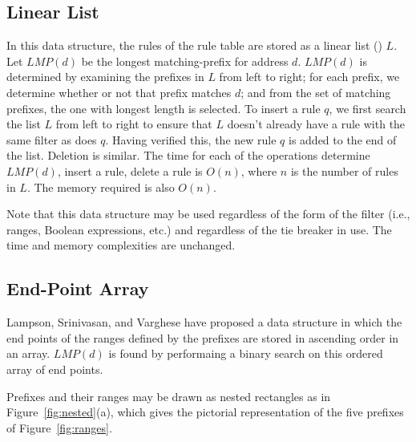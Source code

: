 \subsection{Linear List}
In this data structure, the rules of the rule table are stored as a linear
list (\cite{horo1}) $L$. Let $LMP(d)$ be the longest
matching-prefix for address $d$.
$LMP(d)$ is determined by examining the prefixes in $L$
from left to right; for each prefix, we determine whether or not that prefix
matches $d$; and from the set of matching prefixes, the one with
longest length is selected.
To insert a rule $q$, we first search the list $L$ from left to right to ensure
that $L$ doesn't already have a rule with the same filter as does
$q$. Having verified this, the new rule $q$ is added to the end of the list.
Deletion is similar. The time for each of the operations
determine $LMP(d)$, insert a rule, delete a rule
is $O(n)$, where $n$ is the number of rules in $L$.
The memory required is also $O(n)$.

Note that this data structure may be used regardless of the form of
the filter (i.e., ranges, Boolean expressions, etc.) and
regardless of the tie breaker in use. The time and memory complexities
are unchanged.

\subsection{End-Point Array}\label{sec:endpointarray}
Lampson, Srinivasan, and Varghese \cite{lamp} have proposed a data
structure in which the end points of the ranges defined by the prefixes
are stored in ascending order in an array.
$LMP(d)$ is found
by performaing a binary search on this ordered array of end points.

Prefixes and their ranges may be drawn as nested rectangles as in
Figure~\ref{fig:nested}(a), which gives the pictorial
representation of the five prefixes of
Figure~\ref{fig:ranges}.


